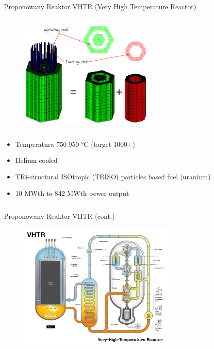 \begin{columnframe}{Proponowany Reaktor VHTR (Very High Temperature Reactor)}
    \begin{column}{0.5\textwidth}
        \begin{figure}
            \centering
            \includegraphics[width=0.6\textwidth, frame]{images/vhtr_core.png}
        \end{figure}
    \end{column}
    \begin{column}{0.5\textwidth}
        \begin{itemize}
            \item Temperatura 750-950 \si{\degreeCelsius} (target 1000+)
            \item Helium cooled
            \item TRi-structural ISOtropic (TRISO) particles based fuel (uranium)
            \item 10 MWth to 842 MWth power output
        \end{itemize}
    \end{column}
\end{columnframe}

\begin{frame}{Proponowany Reaktor VHTR (cont.)}
    \begin{figure}
        \centering
        \includegraphics[width=0.7\textwidth, frame]{images/VHTR.png}
    \end{figure}
\end{frame}

